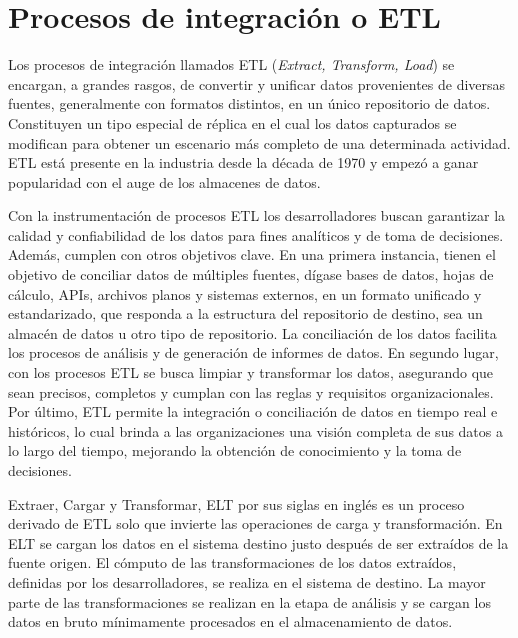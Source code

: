 \section{Procesos de integración o ETL}\label{section:etl}

Los procesos de integración llamados ETL (\emph{Extract, Transform, Load}) se encargan, a grandes rasgos, de convertir y unificar datos provenientes de diversas fuentes, generalmente 
con formatos distintos, en un \'unico repositorio de datos. Constituyen un tipo especial de r\'eplica en el cual los datos 
capturados se modifican para obtener un escenario m\'as completo de una determinada actividad. ETL est\'a presente en la 
industria desde la década de 1970 y empez\'o a ganar popularidad con el auge de los almacenes de datos\cite{etl_vs_elt_amazon}.

Con la instrumentaci\'on de procesos ETL los desarrolladores buscan garantizar la calidad y confiabilidad de los datos para 
fines anal\'iticos y de toma de decisiones. Adem\'as, cumplen con otros objetivos clave. En una primera instancia, 
tienen el objetivo de conciliar datos de m\'ultiples fuentes, d\'igase bases de datos, hojas de c\'alculo, APIs, 
archivos planos y sistemas externos, en un formato unificado y estandarizado, que responda a la estructura del repositorio de destino,
sea un almac\'en de datos u otro tipo de repositorio. 
La conciliación de los datos facilita 
los procesos de an\'alisis y de generación de informes de datos. En segundo lugar, con los procesos ETL se busca 
limpiar y transformar los datos, asegurando que sean precisos, completos y cumplan con las reglas y requisitos organizacionales. 
Por \'ultimo, ETL permite la integración o conciliación de datos en tiempo real e históricos, lo cual brinda a las organizaciones una visión 
completa de sus datos a lo largo del tiempo, mejorando la obtenci\'on de conocimiento y la toma de decisiones.

Extraer, Cargar y Transformar, ELT por sus siglas en ingl\'es es un proceso derivado de ETL solo que invierte las operaciones 
de carga y transformación\cite{raunakjhawar_ETL_microsoft}. En ELT se cargan los datos en el sistema destino justo despu\'es de ser extra\'idos de la fuente 
origen. El cómputo de las transformaciones de los datos extraídos, definidas por los desarrolladores, se realiza en el sistema de destino. 
La mayor parte de las 
transformaciones se realizan en la etapa de análisis y se cargan los datos en bruto mínimamente procesados en el 
almacenamiento de datos.

